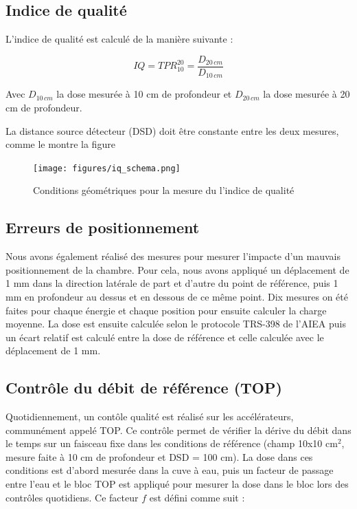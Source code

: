 \documentclass{article}
\begin{document}
\subsection{Indice de qualité}

L'indice de qualité est calculé de la manière suivante :

\begin{equation}
  IQ = TPR^{20}_{10} = \dfrac{D_{20 \, cm}}{D_{10 \, cm}}
  \label{eq_iq}
\end{equation}

Avec $D_{10 \, cm}$ la dose mesurée à 10 cm de profondeur et $D_{20 \, cm}$ la dose mesurée à 20 cm de profondeur.

La distance source détecteur (DSD) doit être constante entre les deux mesures, comme le montre la figure 

\begin{figure}[h]
  \centering
  \texttt{[image: figures/iq\_schema.png]}
  \caption{Conditions géométriques pour la mesure du l'indice de qualité}
  \label{fig_tpr}
\end{figure}

\newpage
\subsection{Erreurs de positionnement}

Nous avons également réalisé des mesures pour mesurer l'impacte d'un mauvais positionnement de la chambre. Pour cela, nous avons appliqué un déplacement de 1 mm dans la direction latérale de part et d'autre du point de référence, puis 1 mm en profondeur au dessus et en dessous de ce même point. Dix mesures on été faites pour chaque énergie et chaque position pour ensuite calculer la charge moyenne. La dose est ensuite calculée selon le protocole TRS-398 de l'AIEA \cite{international2001iaea} puis un écart relatif est calculé entre la dose de référence et celle calculée avec le déplacement de 1 mm.

\subsection{Contrôle du débit de référence (TOP)}

Quotidiennement, un contôle qualité est réalisé sur les accélérateurs, communément appelé TOP. Ce contrôle permet de vérifier la dérive du débit dans le temps sur un faisceau fixe dans les conditions de référence (champ 10x10 cm$^2$, mesure faite à 10 cm de profondeur et DSD = 100 cm). La dose dans ces conditions est d'abord mesurée dans la cuve à eau, puis un facteur de passage entre l'eau et le bloc TOP est appliqué pour mesurer la dose dans le bloc lors des contrôles quotidiens. Ce facteur $f$ est défini comme suit :
\end{document}
